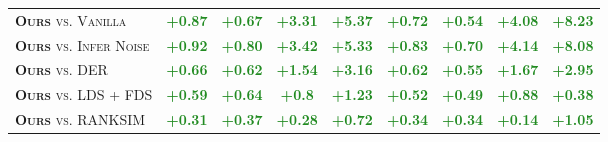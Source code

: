\begin{table}[tbp]
\begin{adjustbox}{valign=t}
\begin{minipage}{0.49\textwidth}
\begin{center}
{\begin{tabular}{l|cccc|cccc}
\textsc{\textbf{Ours} vs. Vanilla} & \textcolor{ForestGreen}{\textbf{+0.87}} & \textcolor{ForestGreen}{\textbf{+0.67}} & \textcolor{ForestGreen}{\textbf{+3.31}} & \textcolor{ForestGreen}{\textbf{+5.37}} & \textcolor{ForestGreen}{\textbf{+0.72}} & \textcolor{ForestGreen}{\textbf{+0.54}} & \textcolor{ForestGreen}{\textbf{+4.08}} & \textcolor{ForestGreen}{\textbf{+8.23}} \\[1.5pt]
\textsc{\textbf{Ours} vs. Infer Noise} & \textcolor{ForestGreen}{\textbf{+0.92}} & \textcolor{ForestGreen}{\textbf{+0.80}} & \textcolor{ForestGreen}{\textbf{+3.42}} & \textcolor{ForestGreen}{\textbf{+5.33}} & \textcolor{ForestGreen}{\textbf{+0.83}} & \textcolor{ForestGreen}{\textbf{+0.70}} & \textcolor{ForestGreen}{\textbf{+4.14}} & \textcolor{ForestGreen}{\textbf{+8.08}} \\[1.5pt]
\textsc{\textbf{Ours} vs. DER} & \textcolor{ForestGreen}{\textbf{+0.66}} & \textcolor{ForestGreen}{\textbf{+0.62}} & \textcolor{ForestGreen}{\textbf{+1.54}} & \textcolor{ForestGreen}{\textbf{+3.16}} & \textcolor{ForestGreen}{\textbf{+0.62}} & \textcolor{ForestGreen}{\textbf{+0.55}} & \textcolor{ForestGreen}{\textbf{+1.67}} & \textcolor{ForestGreen}{\textbf{+2.95}} \\[1.5pt]
\textsc{\textbf{Ours} vs. LDS + FDS} & \textcolor{ForestGreen}{\textbf{+0.59}} & \textcolor{ForestGreen}{\textbf{+0.64}} & \textcolor{ForestGreen}{\textbf{+0.8}} & \textcolor{ForestGreen}{\textbf{+1.23}} & \textcolor{ForestGreen}{\textbf{+0.52}} & \textcolor{ForestGreen}{\textbf{+0.49}} & \textcolor{ForestGreen}{\textbf{+0.88}} & \textcolor{ForestGreen}{\textbf{+0.38}} \\[1.5pt]
\textsc{\textbf{Ours} vs. RANKSIM} & \textcolor{ForestGreen}{\textbf{+0.31}} & \textcolor{ForestGreen}{\textbf{+0.37}} & \textcolor{ForestGreen}{\textbf{+0.28}} & \textcolor{ForestGreen}{\textbf{+0.72}} & \textcolor{ForestGreen}{\textbf{+0.34}} & \textcolor{ForestGreen}{\textbf{+0.34}} & \textcolor{ForestGreen}{\textbf{+0.14}} & \textcolor{ForestGreen}{\textbf{+1.05}} \\
\bottomrule[1.5pt]
\end{tabular}
}
\end{center}
\vspace{-0.5cm}
\end{minipage}
\end{adjustbox}
\end{table} %
%
